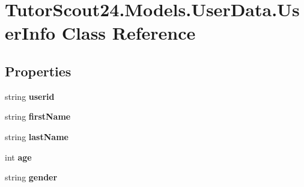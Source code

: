 \hypertarget{class_tutor_scout24_1_1_models_1_1_user_data_1_1_user_info}{}\section{Tutor\+Scout24.\+Models.\+User\+Data.\+User\+Info Class Reference}
\label{class_tutor_scout24_1_1_models_1_1_user_data_1_1_user_info}
\subsection*{Properties}
\begin{DoxyCompactItemize}
\item 
\mbox{\label{class_tutor_scout24_1_1_models_1_1_user_data_1_1_user_info_a5117b025925036a67feabe0b20bae3eb}} 
string {\bfseries userid}
\item 
\mbox{\label{class_tutor_scout24_1_1_models_1_1_user_data_1_1_user_info_a48cb8ad05cacd320bba49e02b65f08a8}} 
string {\bfseries first\+Name}
\item 
\mbox{\label{class_tutor_scout24_1_1_models_1_1_user_data_1_1_user_info_a61612a1a713fc80f5bac552ef9128bb5}} 
string {\bfseries last\+Name}
\item 
\mbox{\label{class_tutor_scout24_1_1_models_1_1_user_data_1_1_user_info_acbee7f623ad418603b61ec5f9eea9a6c}} 
int {\bfseries age}
\item 
\mbox{\label{class_tutor_scout24_1_1_models_1_1_user_data_1_1_user_info_acc99cf49f2c641464f72a13aec46458f}} 
string {\bfseries gender}

\end{DoxyCompactItemize}
